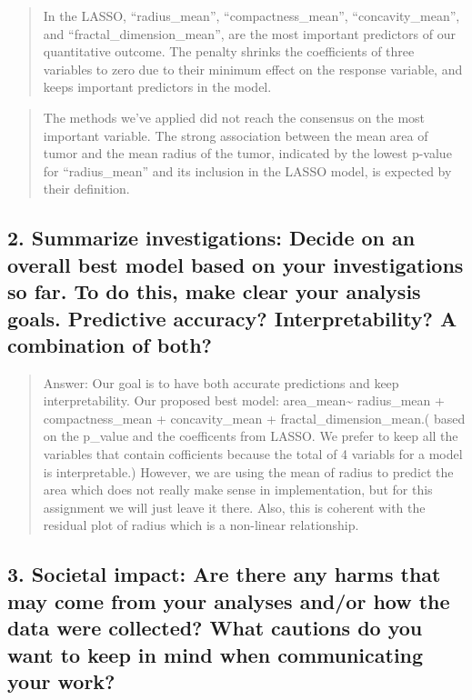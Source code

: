 \documentclass[
]{article}
\begin{document}
\begin{quote}
In the LASSO, ``radius\_mean'', ``compactness\_mean'',
``concavity\_mean'', and ``fractal\_dimension\_mean'', are the most
important predictors of our quantitative outcome. The penalty shrinks
the coefficients of three variables to zero due to their minimum effect
on the response variable, and keeps important predictors in the model.
\end{quote}

\begin{quote}
The methods we've applied did not reach the consensus on the most
important variable. The strong association between the mean area of
tumor and the mean radius of the tumor, indicated by the lowest p-value
for ``radius\_mean'' and its inclusion in the LASSO model, is expected
by their definition.
\end{quote}

\hypertarget{summarize-investigations-decide-on-an-overall-best-model-based-on-your-investigations-so-far.-to-do-this-make-clear-your-analysis-goals.-predictive-accuracy-interpretability-a-combination-of-both}{%
\subsection{2. Summarize investigations: Decide on an overall best model
based on your investigations so far. To do this, make clear your
analysis goals. Predictive accuracy? Interpretability? A combination of
both?}\label{summarize-investigations-decide-on-an-overall-best-model-based-on-your-investigations-so-far.-to-do-this-make-clear-your-analysis-goals.-predictive-accuracy-interpretability-a-combination-of-both}}

\begin{quote}
Answer: Our goal is to have both accurate predictions and keep
interpretability. Our proposed best model: area\_mean\textasciitilde{}
radius\_mean + compactness\_mean + concavity\_mean +
fractal\_dimension\_mean.( based on the p\_value and the coefficents
from LASSO. We prefer to keep all the variables that contain cofficients
because the total of 4 variabls for a model is interpretable.) However,
we are using the mean of radius to predict the area which does not
really make sense in implementation, but for this assignment we will
just leave it there. Also, this is coherent with the residual plot of
radius which is a non-linear relationship.
\end{quote}

\hypertarget{societal-impact-are-there-any-harms-that-may-come-from-your-analyses-andor-how-the-data-were-collected-what-cautions-do-you-want-to-keep-in-mind-when-communicating-your-work}{%
\subsection{3. Societal impact: Are there any harms that may come from
your analyses and/or how the data were collected? What cautions do you
want to keep in mind when communicating your
work?}\label{societal-impact-are-there-any-harms-that-may-come-from-your-analyses-andor-how-the-data-were-collected-what-cautions-do-you-want-to-keep-in-mind-when-communicating-your-work}}
\end{document}
